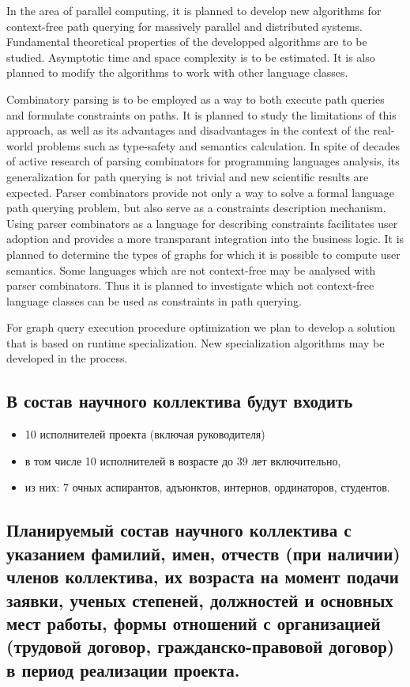 \documentclass[12pt]{article}  %
\theoremstyle{remark}
\begin{document}
In the area of parallel computing, it is planned to develop new algorithms for context-free path querying for massively parallel and distributed systems. Fundamental theoretical properties of the developped algorithms are to be studied. Asymptotic time and space complexity is to be estimated. It is also planned to modify the algorithms to work with other language classes.

Combinatory parsing is to be employed as a way to both execute path queries and formulate constraints on paths. It is planned to study the limitations of this approach, as well as its advantages and disadvantages in the context of the real-world problems such as type-safety and semantics calculation. In spite of decades of active research of parsing combinators for programming languages analysis, its generalization for path querying is not trivial and new scientific results are expected. Parser combinators provide not only a way to solve a formal language path querying problem, but also serve as a constraints description mechanism. Using parser combinators as a language for describing constraints facilitates user adoption and provides a more transparant integration into the business logic. It is planned to determine the types of graphs for which it is possible to compute user semantics. Some languages which are not context-free may be analysed with parser combinators. Thus it is planned to investigate which not context-free language classes can be used as constraints in path querying.

For graph query execution procedure optimization we plan to develop a solution that is based on runtime specialization. New specialization algorithms may be developed in the process.

\subsection{В состав научного коллектива будут входить}
%
\begin{itemize}
\item 10 исполнителей проекта (включая руководителя)
\item в том числе 10  исполнителей в возрасте до 39 лет включительно,
\item из них: 7 очных аспирантов, адъюнктов, интернов, ординаторов, студентов.
\end{itemize}

\subsection{Планируемый состав научного коллектива с указанием фамилий, имен, отчеств (при наличии) членов коллектива, их возраста на момент подачи заявки, ученых степеней, должностей и основных мест работы, формы отношений с организацией (трудовой договор, гражданско-правовой договор) в период реализации проекта.}
\end{document}
